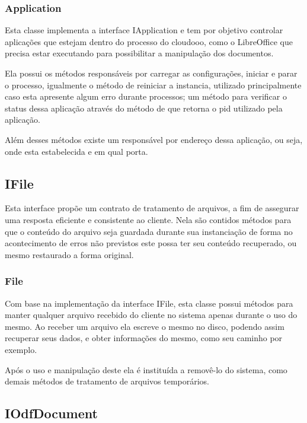 \subsubsection{Application}
\label{application}

Esta classe implementa a interface IApplication e tem por objetivo controlar aplicações que estejam dentro do processo do cloudooo, como o LibreOffice que precisa estar executando para possibilitar a manipulação dos documentos.

Ela possui os métodos responsáveis por carregar as configurações, iniciar e parar o processo, igualmente o método de reiniciar a instancia, utilizado principalmente caso esta apresente algum erro durante processos; um método para verificar o status dessa aplicação através do método de  que retorna o pid utilizado pela aplicação.

Além desses métodos existe um responsável por endereço dessa aplicação, ou seja, onde esta estabelecida e em qual porta.

\subsection{IFile}
\label{ifile}

Esta interface propõe um contrato de tratamento de arquivos, a fim de assegurar uma resposta eficiente e consistente ao cliente. Nela são contidos métodos para que o conteúdo do arquivo seja guardada durante sua instanciação de forma no acontecimento de erros não previstos este possa ter seu conteúdo recuperado, ou mesmo restaurado a forma original.

\subsubsection{File}
\label{file}

Com base na implementação da interface IFile, esta classe possui métodos para manter qualquer arquivo recebido do cliente no sistema apenas durante o uso do mesmo. Ao receber um arquivo ela escreve o mesmo no disco, podendo assim recuperar seus dados, e obter informações do mesmo, como seu caminho por exemplo.

Após o uso e manipulação deste ela é instituída a removê-lo do sistema, como demais métodos de tratamento de arquivos temporários.

\subsection{IOdfDocument}

